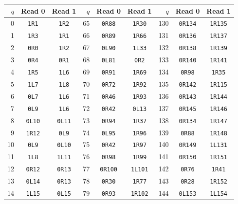 \documentclass[10pt,a4paper]{article}
\renewcommand{\arraystretch}{1.15}
\begin{document}
\begin{center}\fontsize{8.2}{9.0}\selectfont\renewcommand{\arraystretch}{0.96}\setlength{\tabcolsep}{7pt}\begin{tabular}{rcc@{\hspace{14pt}}rcc@{\hspace{14pt}}rcc}\toprule
$q$ & Read 0 & Read 1 & $q$ & Read 0 & Read 1 & $q$ & Read 0 & Read 1 \\\midrule
0 & \texttt{1R1} & \texttt{1R2} & 65 & \texttt{0R88} & \texttt{1R30} & 130 & \texttt{0R134} & \texttt{1R135} \\
1 & \texttt{1R3} & \texttt{1R1} & 66 & \texttt{0R89} & \texttt{1R66} & 131 & \texttt{0R136} & \texttt{1R137} \\
2 & \texttt{0R0} & \texttt{1R2} & 67 & \texttt{0L90} & \texttt{1L33} & 132 & \texttt{0R138} & \texttt{1R139} \\
3 & \texttt{0R4} & \texttt{0R1} & 68 & \texttt{0L81} & \texttt{0R2} & 133 & \texttt{0R140} & \texttt{1R141} \\
4 & \texttt{1R5} & \texttt{1L6} & 69 & \texttt{0R91} & \texttt{1R69} & 134 & \texttt{0R98} & \texttt{1R35} \\
5 & \texttt{1L7} & \texttt{1L8} & 70 & \texttt{0R72} & \texttt{1R92} & 135 & \texttt{0R142} & \texttt{1R115} \\
6 & \texttt{0L7} & \texttt{1L6} & 71 & \texttt{0R46} & \texttt{1R93} & 136 & \texttt{0R143} & \texttt{1R144} \\
7 & \texttt{0L9} & \texttt{1L6} & 72 & \texttt{0R42} & \texttt{0L13} & 137 & \texttt{0R145} & \texttt{1R146} \\
8 & \texttt{0L10} & \texttt{0L11} & 73 & \texttt{0R94} & \texttt{1R37} & 138 & \texttt{0R134} & \texttt{1R147} \\
9 & \texttt{1R12} & \texttt{0L9} & 74 & \texttt{0L95} & \texttt{1R96} & 139 & \texttt{0R88} & \texttt{1R148} \\
10 & \texttt{0L9} & \texttt{0L10} & 75 & \texttt{0R42} & \texttt{1R97} & 140 & \texttt{0R149} & \texttt{1L131} \\
11 & \texttt{1L8} & \texttt{1L11} & 76 & \texttt{0R98} & \texttt{1R99} & 141 & \texttt{0R150} & \texttt{1R151} \\
12 & \texttt{0R12} & \texttt{0R13} & 77 & \texttt{0R100} & \texttt{1L101} & 142 & \texttt{0R76} & \texttt{1R41} \\
13 & \texttt{0L14} & \texttt{0R13} & 78 & \texttt{0R30} & \texttt{1R77} & 143 & \texttt{0R28} & \texttt{1R152} \\
14 & \texttt{1L15} & \texttt{0L15} & 79 & \texttt{0R93} & \texttt{1R102} & 144 & \texttt{0L153} & \texttt{1L154} \\

\end{tabular}
\end{center}
\end{document}
